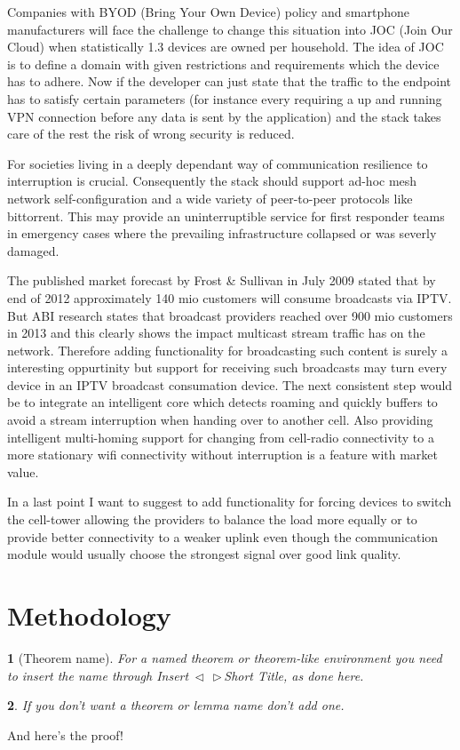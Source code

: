 \documentclass[twocolumn,english]{IEEEtran}
\makeatletter
\DeclareRobustCommand*{\lyxarrow}{%
\@ifstar
{\leavevmode\,$\triangleleft$\,\allowbreak}
{\leavevmode\,$\triangleright$\,\allowbreak}}
\theoremstyle{plain}
\newtheorem{thm}{\protect\theoremname}
\theoremstyle{plain}
\newtheorem{lem}[thm]{\protect\lemmaname}
\providecommand{\lemmaname}{Lemma}
\providecommand{\theoremname}{Theorem}
\makeatother
\begin{document}
Companies with BYOD (Bring Your Own Device) policy and smartphone
manufacturers will face the challenge to change this situation into JOC (Join
Our Cloud) when statistically 1.3 devices are owned per
household\cite{gartner:predicts-2014-cognizant-computing}. The idea of JOC is
to define a domain with given restrictions and requirements which the device
has to adhere. Now if the developer can just state that the traffic to the
endpoint has to satisfy certain parameters (for instance every requiring a up
and running VPN connection before any data is sent by the application) and the
stack takes care of the rest the risk of wrong security is reduced.

For societies living in a deeply dependant way of communication resilience to
interruption is crucial. Consequently the stack should support ad-hoc mesh
network self-configuration and a wide variety of peer-to-peer protocols like
bittorrent. This may provide an uninterruptible service for first responder
teams in emergency cases where the prevailing infrastructure collapsed or was
severly damaged.

The published market forecast by Frost \& Sullivan in July
2009\cite{frost:iptv-market} stated that by end of 2012 approximately 140 mio
customers will consume broadcasts via IPTV. But ABI research states that
broadcast providers reached over 900 mio customers in
2013\cite{abi:iptv-marketshare} and this clearly shows the impact multicast
stream traffic has on the network.  Therefore adding functionality for
broadcasting such content is surely a interesting oppurtinity but support for
receiving such broadcasts may turn every device in an IPTV broadcast
consumation device. The next consistent step would be to integrate an
intelligent core which detects roaming and quickly buffers to avoid a stream
interruption when handing over to another cell. Also providing intelligent
multi-homing support for changing from cell-radio connectivity to a more
stationary wifi connectivity without interruption is a feature with market
value.

In a last point I want to suggest to add functionality for forcing devices to
switch the cell-tower allowing the providers to balance the load more equally
or to provide better connectivity to a weaker uplink even though the
communication module would usually choose the strongest signal over good link
quality.

\section{Methodology}
\begin{thm}[Theorem name]
For a named theorem or theorem-like environment you need to insert
the name through \textsf{Insert\lyxarrow{}Short Title}, as done here.\end{thm}
\begin{lem}
If you don't want a theorem or lemma name don't add one.\end{lem}
\begin{IEEEproof}
And here's the proof!
\end{IEEEproof}
\end{document}
